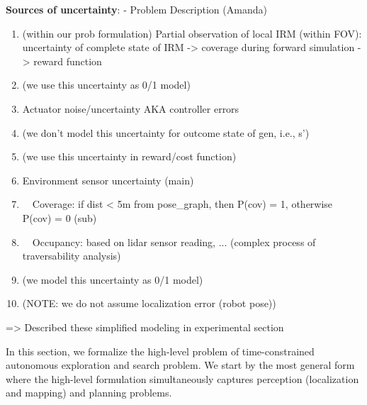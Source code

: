 \documentclass{article}
\newcommand{\ph}[1]{{\textbf{#1}:}} %
\begin{document}
\ph{Sources of uncertainty} - Problem Description (Amanda)
\begin{enumerate}
    \item (within our prob formulation) Partial observation of local IRM (within FOV): uncertainty of complete state of IRM
    -> coverage during forward simulation -> reward function
    \item (we use this uncertainty as 0/1 model)
    
    \item Actuator noise/uncertainty AKA controller errors
    \item (we don't model this uncertainty for outcome state of gen, i.e., s')
    \item (we use this uncertainty in reward/cost function)
    
    \item Environment sensor uncertainty (main)
    \item \ \ Coverage: if dist < 5m from pose_graph, then P(cov) = 1, otherwise P(cov) = 0 (sub)
    \item \ \ Occupancy: based on lidar sensor reading, ... (complex process of traversability analysis)
    \item (we model this uncertainty as 0/1 model)
    
    \item (NOTE: we do not assume localization error (robot pose))
\end{enumerate}
=> Described these simplified modeling in experimental section

In this section, we formalize the high-level problem of time-constrained autonomous exploration and search problem.
We start by the most general form where the high-level formulation simultaneously captures perception (localization and mapping) and planning problems.

\end{document}

